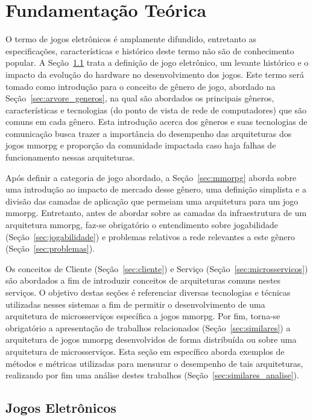 \chapter{Fundamentação Teórica}
\label{cap2}


O termo de jogos eletrônicos é amplamente difundido, entretanto as especificações, características e histórico deste termo não são de conhecimento popular.
%
A Seção~\ref{sec:jogos_eletronicos} trata a definição de jogo eletrônico, um levante histórico e o impacto da evolução do hardware no desenvolvimento dos jogos.
%
Este termo será tomado como introdução para o conceito de gênero de jogo, abordado na Seção~\ref{sec:arvore_generos}, na qual são abordados os principais gêneros, características e tecnologias (do ponto de vista de rede de computadores) que são comuns em cada gênero.
%
Esta introdução acerca dos gêneros e suas tecnologias de comunicação busca trazer a importância do desempenho das arquiteturas dos jogos \ac{mmorpg} e proporção da comunidade impactada caso haja falhas de funcionamento nessas arquiteturas.



Após definir a categoria de jogo abordado, a Seção~\ref{sec:mmorpg} aborda sobre uma introdução ao impacto de mercado desse gênero, uma definição simplista e a divisão das camadas de aplicação que permeiam uma arquitetura para um jogo \ac{mmorpg}.
%
Entretanto, antes de abordar sobre as camadas da infraestrutura de um arquitetura \ac{mmorpg}, faz-se obrigatório o entendimento sobre jogabilidade (Seção~\ref{sec:jogabilidade}) e problemas relativos a rede relevantes a este gênero (Seção~\ref{sec:problemas}).


Os conceitos de Cliente (Seção~\ref{sec:cliente}) e Serviço (Seção~\ref{sec:microsservicos}) são abordados a fim de introduzir conceitos de arquiteturas comuns nestes serviços.
%
O objetivo destas seções é referenciar diversas tecnologias e técnicas utilizadas nesses sistemas a fim de permitir o desenvolvimento de uma arquitetura de microsserviços específica a jogos \ac{mmorpg}.
%
Por fim, torna-se obrigatório a apresentação de trabalhos relacionados (Seção~\ref{sec:similares}) a arquitetura de jogos \ac{mmorpg} desenvolvidos de forma distribuída ou sobre uma arquitetura de microsserviços.
%
Esta seção em específico aborda exemplos de métodos e métricas utilizadas para mensurar o desempenho de tais arquiteturas, realizando por fim uma análise destes trabalhos (Seção~\ref{sec:similares_analise}).


\section{Jogos Eletrônicos}
\label{sec:jogos_eletronicos}



